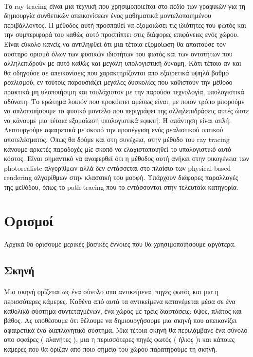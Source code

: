 \begin{sloppypar}
\paragraph{}
	Το ray tracing είναι μια τεχνική που χρησιμοποιείται στο πεδίο των γραφικών για τη
δημιουργία συνθετικών απεικονίσεων ένος μαθηματικά μοντελοποιημένου περιβάλλοντος. Η μέθοδος
αυτή προσπαθεί να εξομοιώσει τις ιδιότητες του φωτός και την συμπεριφορά του καθώς αυτό προσπίπτει
στις διάφορες επιφάνειες ενός χώρου. Είναι εύκολο κανείς να αντιληφθεί ότι μια τέτοια εξομοίωση θα
απαιτούσε τον αυστηρό ορισμό όλων των φυσικών ιδιοτήτων του φωτός και των οντοτήτων που αλληλεπιδρούν
με αυτό καθώς και μεγάλη υπολογιστική δύναμη. Κάτι τέτοιο αν και θα οδηγούσε σε απεικονίσεις που 
χαρακτηρίζονται απο εξαιρετικά υψηλό βαθμό ρεαλισμού, εν τούτοις παρουσιάζει μεγάλες δυσκολίες που 
καθιστούν την μέθοδο πρακτικά μη υλοποιήσιμη και τουλάχιστον με την παρούσα τεχνολογία, 
υπολογιστικά αδύνατη. Το ερώτημα λοιπόν που προκύπτει αμέσως είναι, με ποιον τρόπο μπορούμε να 
απλοποιήσουμε το φυσικό μοντέλο που περιγράφει της αλληλεπιδράσεις αυτές ώστε να κάνουμε μια τέτοια 
εξομοίωση υπολογιστικά εφικτή. Η απάντηση είναι απλή. Λειτουργούμε αφαιρετικά με σκοπό την προσέγγιση 
ενός ρεαλιστικού οπτικού αποτελέσματος. Όπως θα δούμε και στη συνέχεια, στην μέθοδο του ray tracing 
κάνουμε αρκετές παραδοχές μiε σκοπό να ελαχιστοποιηθεί το υπολογιστικό αυτό κόστος. Είναι σημαντικό να
αναφερθεί ότι η μέθοδος αυτή ανήκει στην οικογένεια των photorealistc αλγορίθμων αλλά δεν εντάσσεται 
στο πλαίσιο των physical based rendering αλγορίθμων στην κλασσική του μορφή. Υπάρχουν διάφορες 
παραλλαγές της μεθόδου, όπως το path tracing που το εντάσσονται στην τελευταία κατηγορία.

\section{Ορισμοί}
\paragraph{}
	Αρχικά θα ορίσουμε μερικές βασικές έννοιες που θα χρησιμοποιήσουμε αργότερα.

\subsection{Σκηνή}
\paragraph{}
	Μια σκηνή ορίζεται ως ένα σύνολο απο αντικείμενα, πηγές φωτός και μια η περισσότερες κάμερες.
Καθένα από αυτά τα αντικείμενα κατανέμεται μέσα σε ένα καθολικό σύστημα συντεταγμένων, ένα χώρος με 
τρεις διαστάσεις: ύψος, πλάτος και βάθος. Ας υποθέσουμε ότι θέλουμε να δημιουργήσουμε μια σκηνή που 
απεικονίζει αφαιρετικά ένα διαπλανητικό σύστημα. Μια τέτοια σκηνή θα περιλάμβανε ένα σύνολο απο 
σφαίρες ( πλανήτες ), μια η περισσότερες πηγές φωτός ( ήλιος )ι και κάποιες κάμερες που θα όριζαν 
από ποιο σημείο του χώρου παρατηρούμε τη σκηνή.


\end{sloppypar}
